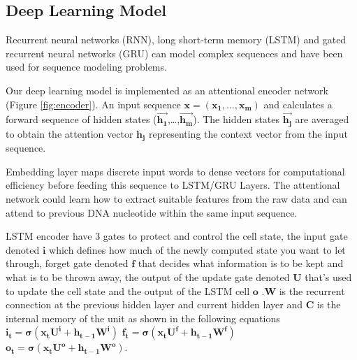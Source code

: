 \documentclass[conference]{IEEEtran}
\begin{document}

\subsection{Deep Learning Model}
Recurrent neural networks (RNN), long short-term memory (LSTM) \cite{hochreiter1997long} and gated recurrent neural networks (GRU) \cite{chung2014empirical} can model complex sequences and have been used for sequence modeling problems.

Our deep learning model is implemented as an attentional encoder network (Figure \ref{fig:encoder}). An input sequence  $\mathbf{x = (x_{1} , \ldots{} , x_{m} )}$  and calculates a forward sequence of hidden states  ($\mathbf{\overrightarrow{h_{1}}}$,\ldots{},$\mathbf{ \overrightarrow{h_{m}}}$). The hidden states $\mathbf{\overrightarrow{h_{j}}}$  are averaged to obtain the attention vector $\mathbf{h_{j}}$ representing the context vector from the input sequence.

Embedding layer maps discrete input words to dense vectors for computational efficiency before feeding this sequence to LSTM/GRU Layers. The attentional network could learn how to extract suitable features from the raw data and can attend to previous DNA nucleotide within the same input sequence. 

LSTM encoder have 3 gates to protect and control the cell state, the input gate denoted $\mathbf{i}$ which defines how much of the newly computed state you want to let through, forget gate denoted $\mathbf{f}$ that decides what information is to be kept and what is to be thrown away,  the output of the update gate denoted $\mathbf{U}$ that's used to update the cell state and the output of the LSTM cell $\mathbf{o}$ .$\mathbf{W}$ is the recurrent connection at the previous hidden layer and current hidden layer and $\mathbf{C}$ is the internal memory of the unit  as shown in the following equations \newline
$\mathbf{i_{t}=\sigma(x_{t}U^i + h_{t-1}W^i)}$ \newline
$\mathbf{f_{t}=\sigma(x_{t}U^f + h_{t-1}W^f)}$ \newline
$\mathbf{o_{t}=\sigma(x_{t}U^o + h_{t-1}W^o)}$. 
\end{document}
